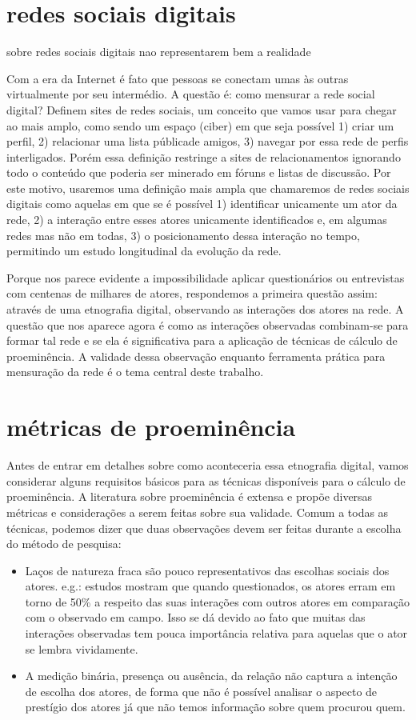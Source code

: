 \documentclass{article}
\begin{document}
\section{redes sociais digitais}

\cite{Clemons2007} sobre redes sociais digitais nao representarem bem a
realidade

Com a era da Internet é fato que pessoas se conectam umas às outras virtualmente
por seu intermédio. A questão é: como mensurar a rede social digital? Definem
sites de redes sociais, um conceito que vamos usar para chegar ao mais amplo,
como sendo um espaço (ciber) em que seja possível 1) criar um perfil, 2)
relacionar uma lista públicade amigos, 3) navegar por essa rede de perfis
interligados. Porém essa definição restringe a sites de relacionamentos
ignorando todo o conteúdo que poderia ser minerado em fóruns e listas de
discussão. Por este motivo, usaremos uma definição mais ampla que chamaremos de
redes sociais digitais como aquelas em que se é possível 1) identificar
unicamente um ator da rede, 2) a interação entre esses atores unicamente
identificados e, em algumas redes mas não em todas, 3) o posicionamento dessa
interação no tempo, permitindo um estudo longitudinal da evolução da rede.

Porque nos parece evidente a impossibilidade aplicar questionários ou
entrevistas com centenas de milhares de atores, respondemos a primeira questão
assim: através de uma etnografia digital, observando as interações dos atores na
rede. A questão que nos aparece agora é como as interações observadas
combinam-se para formar tal rede e se ela é significativa para a aplicação de
técnicas de cálculo de proeminência. A validade dessa observação enquanto
ferramenta prática para mensuração da rede é o tema central deste trabalho.

\section{métricas de proeminência}

Antes de entrar em detalhes sobre como aconteceria essa etnografia digital,
vamos considerar alguns requisitos básicos para as técnicas disponíveis para o
cálculo de proeminência. A literatura sobre proeminência é extensa e propõe
diversas métricas e considerações a serem feitas sobre sua validade. Comum a
todas as técnicas, podemos dizer que duas observações devem ser feitas durante
a escolha do método de pesquisa:
\begin{itemize}
\item Laços de natureza fraca são pouco representativos das escolhas sociais dos
atores. e.g.: estudos mostram que quando questionados, os atores erram em torno
de 50\% a respeito das suas interações com outros atores em comparação com o
observado em campo. Isso se dá devido ao fato que muitas das interações
observadas tem pouca importância relativa para aquelas que o ator se lembra
vividamente.
\item A medição binária, presença ou ausência, da relação não captura a intenção
de escolha dos atores, de forma que não é possível analisar o aspecto de
prestígio dos atores já que não temos informação sobre quem procurou quem.
\end{itemize}
\end{document}
